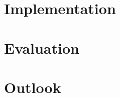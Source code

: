 \documentclass[12pt]{report}
\begin{document}
\chapter{Implementation} \label{ch:implementation}

\chapter{Evaluation} \label{ch:evaluation}

\chapter{Outlook} \label{ch:outlook}


% 



\end{document}
